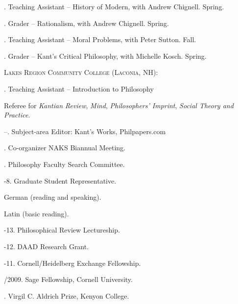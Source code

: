 \documentclass[11pt]{article}
\begin{document}
. Teaching Assistant -- History of Modern, with Andrew Chignell. Spring.

. Grader -- Rationalism, with Andrew Chignell. Spring.

. Teaching Assistant -- Moral Problems, with Peter Sutton. Fall.

. Grader -- Kant’s Critical Philosophy, with Michelle Kosch. Spring.
\medskip

\noindent \textsc{Lakes Region Community College (Laconia, NH):}
\medskip

. Teaching Assistant – Introduction to Philosophy

\bigskip


\medskip

\ind Referee for \emph{Kantian Review}, \emph{Mind}, \emph{Philosophers' Imprint}, \emph{Social Theory and Practice}.

--. Subject-area Editor: Kant's Works, Philpapers.com

. Co-organizer NAKS Biannual Meeting.

. Philosophy Faculty Search Committee.

-8. Graduate Student Representative.

\bigskip


\medskip

\ind German (reading and speaking). 

\ind Latin (basic reading).

\newpage


\medskip

-13. Philosophical Review Lectureship.

-12. DAAD Research Grant.

-11. Cornell/Heidelberg Exchange Fellowship.

/2009. Sage Fellowship, Cornell University.

. Virgil C. Aldrich Prize, Kenyon College.

\bigskip



\end{document}
